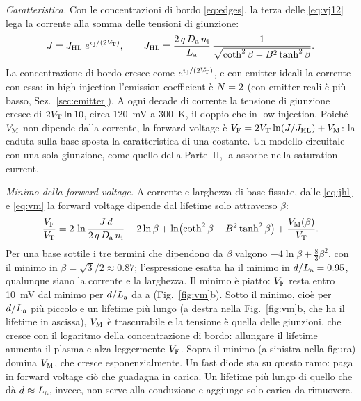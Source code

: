 \documentclass[10pt,a4paper]{scrartcl}
\let\newcommand\pdvaluedefine
\newcommand{\VF}{V_\mathrm{F}}
\newcommand{\vj}{v_\mathrm{j}}
\newcommand{\VT}{V_\mathrm{T}}
\newcommand{\Nem}{N}                          %
\newcommand{\nint}{n_\mathrm{i}}
\newcommand{\Da}{D_\mathrm{a}}
\newcommand{\La}{L_\mathrm{a}}
\newcommand{\VM}{V_\mathrm{M}}
\begin{document}
\emph{Caratteristica.} Con le concentrazioni di bordo \eqref{eq:edges}, la terza delle \eqref{eq:vj12} lega la corrente alla somma delle tensioni di giunzione:
\begin{equation}
J = J_\mathrm{HL}\;e^{\vj/(2\VT)} , \qquad J_\mathrm{HL} = \frac{2\,q\,\Da\,\nint}{\La}\,\frac{1}{\sqrt{\coth^2\beta - B^2\tanh^2\beta}} .
\label{eq:jhl}
\end{equation}
La concentrazione di bordo cresce come $e^{\vj/(2\VT)}$, e con emitter ideali la corrente con essa: in high injection l'emission coefficient è $\Nem = 2$ (con emitter reali è più basso, Sez.~\ref{sec:emitter}). A ogni decade di corrente la tensione di giunzione cresce di $2\VT\ln 10$, circa \SI{120}{\milli\volt} a \SI{300}{\kelvin}, il doppio che in low injection. Poiché $\VM$ non dipende dalla corrente, la forward voltage è $\VF = 2\VT\ln(J/J_\mathrm{HL}) + \VM$: la caduta sulla base sposta la caratteristica di una costante. Un modello circuitale con una sola giunzione, come quello della Parte~II, la assorbe nella saturation current.

\emph{Minimo della forward voltage.} A corrente e larghezza di base fissate, dalle \eqref{eq:jhl} e \eqref{eq:vm} la forward voltage dipende dal lifetime solo attraverso $\beta$:
\begin{equation}
\frac{\VF}{\VT} = 2\,\ln\frac{J\,d}{2\,q\,\Da\,\nint} - 2\ln\beta + \ln\bigl(\coth^2\beta - B^2\tanh^2\beta\bigr) + \frac{\VM(\beta)}{\VT} .
\label{eq:vfbeta}
\end{equation}
Per una base sottile i tre termini che dipendono da $\beta$ valgono $-4\ln\beta + \tfrac{8}{3}\beta^2$, con il minimo in $\beta = \sqrt{3}/2 \approx \num{0.87}$; l'espressione esatta ha il minimo in $d/\La = \pdVfMinBeta$, qualunque siano la corrente e la larghezza. Il minimo è piatto: $\VF$ resta entro \SI{10}{\milli\volt} dal minimo per $d/\La$ da \pdVfFlatLo{} a \pdVfFlatHi{} (Fig.~\ref{fig:vm}b). Sotto il minimo, cioè per $d/\La$ più piccolo e un lifetime più lungo (a destra nella Fig.~\ref{fig:vm}b, che ha il lifetime in ascissa), $\VM$ è trascurabile e la tensione è quella delle giunzioni, che cresce con il logaritmo della concentrazione di bordo: allungare il lifetime aumenta il plasma e alza leggermente $\VF$. Sopra il minimo (a sinistra nella figura) domina $\VM$, che cresce esponenzialmente. Un fast diode sta su questo ramo: paga in forward voltage ciò che guadagna in carica. Un lifetime più lungo di quello che dà $d \approx \La$, invece, non serve alla conduzione e aggiunge solo carica da rimuovere.
\end{document}
